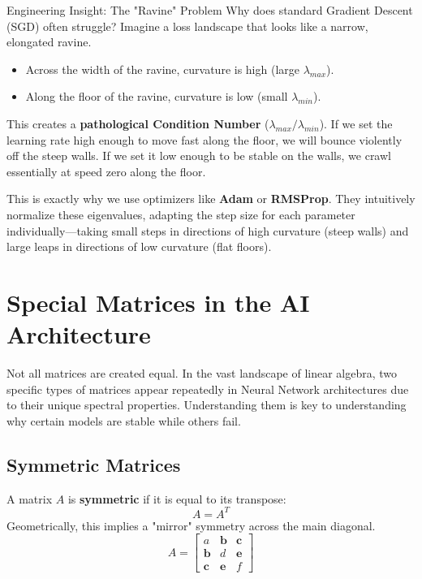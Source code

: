 \documentclass[12pt,a4paper,twoside,openright]{book}
\begin{document}
\begin{unibobox}{Engineering Insight: The "Ravine" Problem}
Why does standard Gradient Descent (SGD) often struggle?
Imagine a loss landscape that looks like a narrow, elongated ravine.
\begin{itemize}
    \item Across the width of the ravine, curvature is high (large $\lambda_{max}$).
    \item Along the floor of the ravine, curvature is low (small $\lambda_{min}$).
\end{itemize}

This creates a \textbf{pathological Condition Number} ($\lambda_{max} / \lambda_{min}$).
If we set the learning rate high enough to move fast along the floor, we will bounce violently off the steep walls. If we set it low enough to be stable on the walls, we crawl essentially at speed zero along the floor.

This is exactly why we use optimizers like \textbf{Adam} or \textbf{RMSProp}. They intuitively normalize these eigenvalues, adapting the step size for each parameter individually—taking small steps in directions of high curvature (steep walls) and large leaps in directions of low curvature (flat floors).
\end{unibobox}

\section{Special Matrices in the AI Architecture}

Not all matrices are created equal. In the vast landscape of linear algebra, two specific types of matrices appear repeatedly in Neural Network architectures due to their unique spectral properties. Understanding them is key to understanding why certain models are stable while others fail.

\subsection{Symmetric Matrices}

A matrix $A$ is \textbf{symmetric} if it is equal to its transpose:
\[ A = A^T \]
Geometrically, this implies a "mirror" symmetry across the main diagonal.
$$A = \begin{bmatrix}
a &  \textbf{b} & \textbf{c} \\
\textbf{b} & d & \textbf{e} \\
\textbf{c} & \textbf{e} & f
\end{bmatrix}$$
\end{document}

